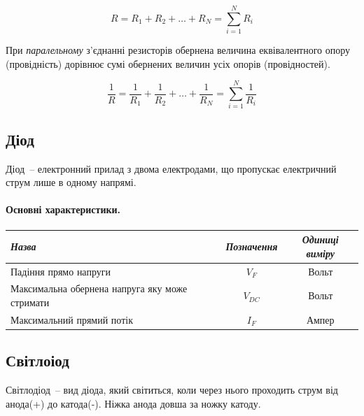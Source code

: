 \documentclass[12pt,a4paper]{report}  %
\begin{document}
    $$R=R_{1}+R_{2}+\dots +R_{N}=\sum _{i=1}^{N}R_{i}$$
    
При \textit{паралельному} з'єднанні резисторів обернена величина еквівалентного опору (провідність) дорівнює сумі обернених величин усіх опорів (провідностей).

    $$ \frac{1}{R} = \frac{1}{R_{1}}+\frac{1}{R_{2}}+ \dots + \frac{1}{R_{N}}= \sum_{i=1}^{N}\frac{1}{R_{i}}$$

\subsection{Діод}

Діод~-- електронний прилад з двома електродами, що пропускає електричний струм лише в одному напрямі. 

\paragraph{Основні характеристики.}

\begin{center}
\begin{tabular}{|l|c|c|}
\hline
\textit{Назва} & \textit{Позначення} & \textit{Одиниці виміру} \\
\hline
Падіння прямо напруги & $V_F$ & Вольт \\
\hline		
Максимальна обернена напруга яку може стримати & $V_{DC}$ & Вольт \\
\hline
Максимальний прямий потік & $I_F$ & Ампер \\
\hline
\end{tabular}
\end{center}


\subsection{Світлоіод}

Світлодіод~-- вид діода, який світиться, коли через нього проходить струм від анода(+) до катода(-). Ніжка анода довша за ножку катоду.
\end{document}
